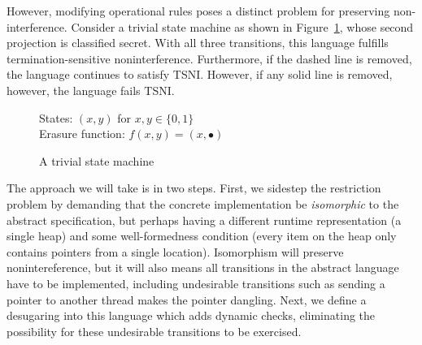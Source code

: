 However, modifying operational rules poses a distinct problem for
preserving non-interference.  Consider a trivial state machine as shown
in Figure~\ref{fig:trivial-sm}, whose second projection is classified
secret.  With all three transitions, this language fulfills
termination-sensitive noninterference.  Furthermore, if the dashed line
is removed, the language continues to satisfy TSNI.  However, if any
solid line is removed, however, the language fails TSNI.

\begin{figure}
    States: $(x,y)$ for $x,y \in \{0,1\}$ \\
    Erasure function: $f(x,y) = (x,\bullet)$

    \begin{center}\end{center}

    \label{fig:trivial-sm}
    \caption{A trivial state machine}
\end{figure}

The approach we will take is in two steps.  First, we sidestep the
restriction problem by demanding that the concrete implementation be
\emph{isomorphic} to the abstract specification, but perhaps having a different
runtime representation (a single heap) and some well-formedness
condition (every item on the heap only contains pointers from a single
location).  Isomorphism will preserve nonintereference, but it will also means all
transitions in the abstract language have to be implemented, including
undesirable transitions such as sending a pointer to another thread makes
the pointer dangling.  Next, we define a desugaring into this language
which adds dynamic checks, eliminating the possibility for these undesirable
transitions to be exercised.



